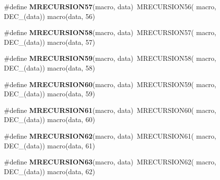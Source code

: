 \begin{DoxyCompactItemize}
\item 
\hypertarget{group__group__sam0__utils__mrecursion_ga701249519fa778a36982d5e3079aed83}{}\#define {\bfseries M\+R\+E\+C\+U\+R\+S\+I\+O\+N57}(macro,  data)~M\+R\+E\+C\+U\+R\+S\+I\+O\+N56(  macro, D\+E\+C\+\_\+(data))   macro(data, 56)\label{group__group__sam0__utils__mrecursion_ga701249519fa778a36982d5e3079aed83}

\item 
\hypertarget{group__group__sam0__utils__mrecursion_gad03d64f80b3b5e94dd9e1d3a2e1e2feb}{}\#define {\bfseries M\+R\+E\+C\+U\+R\+S\+I\+O\+N58}(macro,  data)~M\+R\+E\+C\+U\+R\+S\+I\+O\+N57(  macro, D\+E\+C\+\_\+(data))   macro(data, 57)\label{group__group__sam0__utils__mrecursion_gad03d64f80b3b5e94dd9e1d3a2e1e2feb}

\item 
\hypertarget{group__group__sam0__utils__mrecursion_gad8878230dd012dbaabd3e2b8a309fafb}{}\#define {\bfseries M\+R\+E\+C\+U\+R\+S\+I\+O\+N59}(macro,  data)~M\+R\+E\+C\+U\+R\+S\+I\+O\+N58(  macro, D\+E\+C\+\_\+(data))   macro(data, 58)\label{group__group__sam0__utils__mrecursion_gad8878230dd012dbaabd3e2b8a309fafb}

\item 
\hypertarget{group__group__sam0__utils__mrecursion_gae264d2df1687efc33a4381c9dea0f925}{}\#define {\bfseries M\+R\+E\+C\+U\+R\+S\+I\+O\+N60}(macro,  data)~M\+R\+E\+C\+U\+R\+S\+I\+O\+N59(  macro, D\+E\+C\+\_\+(data))   macro(data, 59)\label{group__group__sam0__utils__mrecursion_gae264d2df1687efc33a4381c9dea0f925}

\item 
\hypertarget{group__group__sam0__utils__mrecursion_ga9ee049c290930ecf8675806b5cdb8266}{}\#define {\bfseries M\+R\+E\+C\+U\+R\+S\+I\+O\+N61}(macro,  data)~M\+R\+E\+C\+U\+R\+S\+I\+O\+N60(  macro, D\+E\+C\+\_\+(data))   macro(data, 60)\label{group__group__sam0__utils__mrecursion_ga9ee049c290930ecf8675806b5cdb8266}

\item 
\hypertarget{group__group__sam0__utils__mrecursion_ga6e6d5152fa7a0cb287f6df4c79043ef1}{}\#define {\bfseries M\+R\+E\+C\+U\+R\+S\+I\+O\+N62}(macro,  data)~M\+R\+E\+C\+U\+R\+S\+I\+O\+N61(  macro, D\+E\+C\+\_\+(data))   macro(data, 61)\label{group__group__sam0__utils__mrecursion_ga6e6d5152fa7a0cb287f6df4c79043ef1}

\item 
\hypertarget{group__group__sam0__utils__mrecursion_gacb4f4ed0c1f5953daf02b6887354c2f4}{}\#define {\bfseries M\+R\+E\+C\+U\+R\+S\+I\+O\+N63}(macro,  data)~M\+R\+E\+C\+U\+R\+S\+I\+O\+N62(  macro, D\+E\+C\+\_\+(data))   macro(data, 62)\label{group__group__sam0__utils__mrecursion_gacb4f4ed0c1f5953daf02b6887354c2f4}


\end{DoxyCompactItemize}
